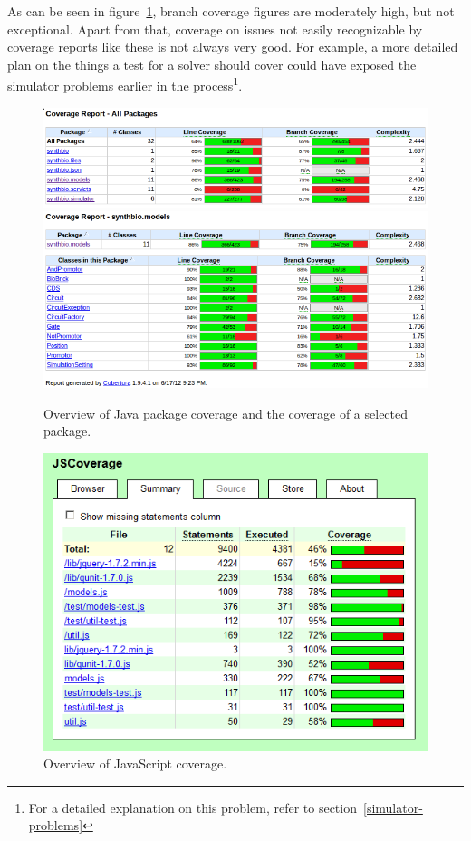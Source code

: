 \documentclass[a4paper]{article}
\begin{document}
As can be seen in figure~\ref{fig-java-coverage}, branch coverage figures are moderately high, but not exceptional. Apart from that, coverage on issues not easily recognizable by coverage reports like these is not always very good. For example, a more detailed plan on the things a test for a solver should cover could have exposed the simulator problems earlier in the process\footnote{For a detailed explanation on this problem, refer to section~\ref{simulator-problems}}.
\begin{figure}[h!]
	\includegraphics[width=\textwidth]{pictures/java-coverage-packages.png}
	\includegraphics[width=\textwidth]{pictures/java-coverage-models.png}
	\caption{Overview of Java package coverage and the coverage of a selected package.}
	\label{fig-java-coverage}
\end{figure}
\begin{figure}[h!]
	\centering\includegraphics[width=.7\textwidth]{../../screenshots/2012-06-17-jscoverage-report-small.png}
	\caption{Overview of JavaScript coverage.}
	\label{fig-javascript-coverage}
\end{figure}
\end{document}
